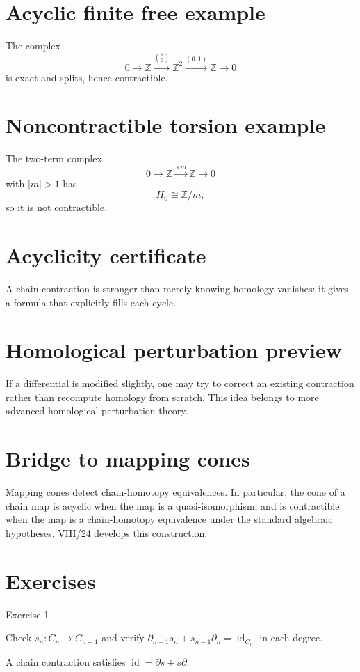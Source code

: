 \section{Acyclic finite free example}
The complex
\[
0\to\mathbb Z
\xrightarrow{\binom{1}{0}}
\mathbb Z^2
\xrightarrow{(0\ \ 1)}
\mathbb Z
\to0
\]
is exact and splits, hence contractible.

\section{Noncontractible torsion example}
The two-term complex
\[
0\to\mathbb Z\xrightarrow{\times m}\mathbb Z\to0
\]
with \(|m|>1\) has
\[
H_0\cong\mathbb Z/m,
\]
so it is not contractible.

\section{Acyclicity certificate}
A chain contraction is stronger than merely knowing homology vanishes: it gives
a formula that explicitly fills each cycle.

\section{Homological perturbation preview}
If a differential is modified slightly, one may try to correct an existing
contraction rather than recompute homology from scratch.  This idea belongs to
more advanced homological perturbation theory.

\section{Bridge to mapping cones}
Mapping cones detect chain-homotopy equivalences.  In particular, the cone of a
chain map is acyclic when the map is a quasi-isomorphism, and is contractible
when the map is a chain-homotopy equivalence under the standard algebraic
hypotheses.  VIII/24 develops this construction.


\section{Exercises}

\begin{exercise}\label{exr:viii23-01}
Exercise 1
\end{exercise}
\begin{hint}
Check \(s_n:C_n\to C_{n+1}\) and verify \(\partial_{n+1}s_n+s_{n-1}\partial_n=\operatorname{id}_{C_n}\) in each degree.
\end{hint}
\begin{solution}
A chain contraction satisfies \(\operatorname{id}=\partial s+s\partial\).
\end{solution}

